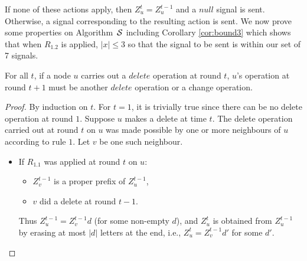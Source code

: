 \documentclass[11pt,envcountsame,letterpaper]{llncs}
\begin{document}
If none of these actions apply, then $Z_u^t=Z_u^{t-1}$ and a $null$ signal is sent. Otherwise, a signal corresponding to the resulting action is sent.
We now prove some properties on Algorithm~$\cal S$ including Corollary \ref{cor:bound3}
which shows that when $R_{1.2}$ is applied, $|x|\le 3$ so that the signal to be sent
is within our set of 7 signals.


\begin{lemma}
\label{lem:delete}
For all $t$, if a node $u$ carries out a $delete$ operation at round $t$,
$u$'s operation at round $t+1$ must be another $delete$ operation
or a change operation.
\end{lemma}

\begin{proof}
By induction on $t$. For $t=1$, it is trivially true since there can be no
delete operation at round $1$.
Suppose $u$ makes a delete at time $t$.
The delete operation  carried out 
at round $t$ on $u$ was made
possible by one or more neighbours of $u$ according to rule
$1$. Let $v$ be one such neighbour.


\begin{itemize}
\item
If $R_{1.1}$ was applied at round $t$ on $u$:
\begin{itemize}
\item  $Z_v^{t-1}$ is a proper prefix of $Z_u^{t-1}$,
\item $v$ did a delete at round $t-1$.
\end{itemize}
Thus 
$Z_u^{t-1}=Z_v^{t-1}d$ (for some
non-empty $d$), and
$Z_u^{t}$ is obtained from $Z_u^{t-1}$  by erasing at most $|d|$
letters at the end, i.e., $Z_u^{t}=Z_v^{t-1} d'$ for some $d'$.


\end{itemize}
\end{proof}
\end{document}
